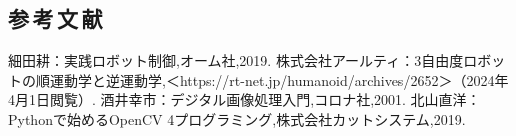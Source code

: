 \newpage
\begin{center}
  \section*{参\,考\,文\,献}                      %
\end{center}

\begin{thebibliography}{9}
   細田耕：実践ロボット制御,オーム社,2019.
   株式会社アールティ：3自由度ロボットの順運動学と逆運動学,＜https://rt-net.jp/humanoid/archives/2652＞（2024年4月1日閲覧）.
   酒井幸市：デジタル画像処理入門,コロナ社,2001.
   北山直洋：Pythonで始めるOpenCV 4プログラミング,株式会社カットシステム,2019.
\end{thebibliography}


